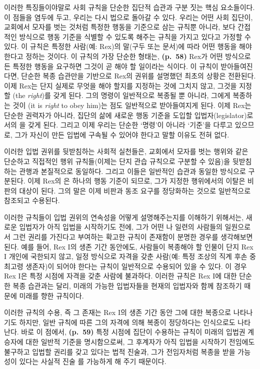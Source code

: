 이러한 특징들이야말로 사회 규칙을 단순한 집단적 습관과 구분 짓는 핵심
요소들이다. 이 점들을 염두에 두고, 우리는 다시 법으로 돌아갈 수 있다.
우리는 어떤 사회 집단이, 교회에서 모자를 벗는 것처럼 특정한 행동을
기준으로 삼는 규칙뿐 아니라, 보다 간접적인 방식으로 행동 기준을 식별할
수 있도록 해주는 규칙을 가지고 있다고 가정할 수 있다. 이 규칙은 특정한
사람(예: Rex)의 말(구두 또는 문서)에 따라 어떤 행동을 해야 한다고 정하는
것이다. 이 규칙의 가장 단순한 형태는, \textbf{(p.~58)} Rex가 어떤
방식으로든 특정한 행동을 요구하면 그것이 곧 해야 할 일이라는 식이다. 이
규칙이 받아들여진다면, 단순한 복종 습관만을 기반으로 Rex의 권위를
설명했던 최초의 상황은 전환된다. 이제 Rex는 단지 실제로 무엇을 해야
할지를 지정하는 것에 그치지 않고, 그것을 지정할 (the
\emph{right})를 갖게 된다. 그의 명령이 일반적으로 복종될 뿐 아니라,
그에게 복종하는 것이 (it is \emph{right} to obey him)는 점도
일반적으로 받아들여지게 된다. 이제 Rex는 단순한 권력자가 아니라, 집단의
삶에 새로운 행동 기준을 도입할 입법자(legislator)로서의
을 갖게 된다. 그리고 이제 우리는 단순한 `명령'이
아니라 `기준'을 다루고 있으므로, 그가 자신이 만든 입법에 구속될 수
있어야 한다고 말할 이유도 전혀 없다.

이러한 입법 권위를 뒷받침하는 사회적 실천들은, 교회에서 모자를 벗는
행위와 같은 단순하고 직접적인 행위 규칙들(이제는 단지 관습 규칙으로
구분할 수 있음)을 뒷받침하는 관행과 본질적으로 동일하다. 그리고 이들은
일반적인 습관과 동일한 방식으로 구분된다. 이제 Rex의 은
하나의 행동 기준이 되므로, 그가 지정한 행위에서의 이탈은 비판의 대상이
된다. 그의 말은 이제 비판과 동조 요구를 정당화하는 것으로 일반적으로
참조되고 수용된다.

이러한 규칙들이 입법 권위의 연속성을 어떻게 설명해주는지를 이해하기
위해서는, 새로운 입법자가 아직 입법을 시작하기도 전에, 그가 어떤
나 일련의 사람들의 일원으로서 그런 권리를 가진다고
부여하는 확고한 규칙이 존재함이 분명한 경우를 생각해보면 된다. 예를
들어, Rex I의 생존 기간 동안에도, 사람들이 복종해야 할 인물이 단지 Rex I
개인에 국한되지 않고, 일정 방식으로 자격을 갖춘 사람(예: 특정 조상의
직계 후손 중 최고령 생존자)이 되어야 한다는 규칙이 일반적으로 수용되어
있을 수 있다. 이 경우 Rex I은 특정 시점에 자격을 갖춘 사람에 불과하다.
이러한 규칙은 Rex I에 대한 단순한 복종 습관과는 달리, 미래의 가능한
입법자들을 현재의 입법자와 함께 참조하기 때문에 미래를 향한 규칙이다.

이러한 규칙의 수용, 즉 그 존재는 Rex I의 생존 기간 동안 그에 대한
복종으로 나타나기도 하지만, 일반 규칙에 따른 그의 자격에 의해 복종이
정당하다는 인식으로도 나타난다. 바로 이 점에서, \textbf{(p.~59)} 특정
시점에 집단이 수용하는 규칙이 미래의 입법권 계승자에 대한 일반적 기준을
명시함으로써, 그 후계자가 아직 입법을 시작하기 전임에도 불구하고 입법할
권리를 갖고 있다는 법적 진술과, 그가 전임자처럼 복종을 받을 가능성이
있다는 사실적 진술 를 가능하게 해 주기 때문이다.

